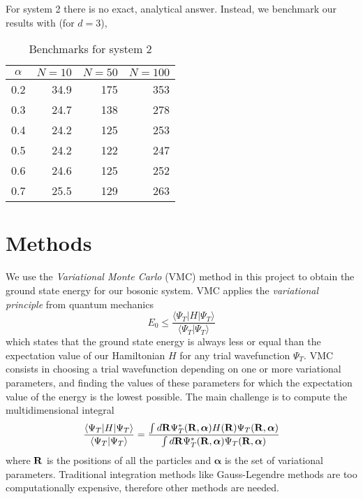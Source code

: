 \documentclass[english, a4paper]{article}
\begin{document}
\noindent For system 2 there is no exact, analytical answer. Instead, we benchmark
our results with \cite{ref1} (for $d=3$),
\begin{table}[H]
  \centering
  \begin{tabular}{ | c | r | r | r | }
    \hline
    $\alpha$& $N=10$& $N=50$& $N=100$ \\*
    \hline
    0.2& 34.9& 175& 353 \\*
    \hline
    0.3& 24.7& 138& 278 \\*
    \hline
    0.4& 24.2& 125& 253 \\*
    \hline
    0.5& 24.2& 122& 247 \\*
    \hline
    0.6& 24.6& 125& 252 \\*
    \hline
    0.7& 25.5& 129& 263 \\*
    \hline
  \end{tabular}
  \caption{Benchmarks for system 2}
  \label{tab:Tabell1}
\end{table}



















\section{Methods}

We use the \textit{Variational Monte Carlo} (VMC) method in this project to obtain the ground state energy
for our bosonic system. VMC applies the \textit{variational principle} from quantum mechanics
\begin{equation}
 E_0 \leq \frac{\langle \Psi_T | H | \Psi_T \rangle}{\langle \Psi_T | \Psi_T \rangle}
\end{equation}
which states that the ground state energy is always less or equal than the expectation value of our Hamiltonian $H$
for any trial wavefunction $\Psi_T$. VMC consists in choosing a trial wavefunction depending on one or more
variational parameters, and finding the values of these parameters for which the expectation value of the 
energy is the lowest possible. The main challenge is to compute the multidimensional integral
\begin{equation}
 \frac{\langle \Psi_T | H | \Psi_T \rangle}{\langle \Psi_T | \Psi_T \rangle} = 
 \frac{\int d {\bf R} \Psi_T^*({\bf R}, \boldsymbol{\alpha}) H({\bf R}) \Psi_T({\bf R}, \boldsymbol{\alpha})}
       {\int d {\bf R} \Psi_T^*({\bf R}, \boldsymbol{\alpha}) \Psi_T({\bf R}, \boldsymbol{\alpha})}
 \label{multidim}
\end{equation}
where $\bf{R}$ is the positions of all the particles and $\boldsymbol{\alpha}$ is the set of variational parameters.
Traditional integration methods like Gauss-Legendre methods are too computationally expensive, therefore 
other methods are needed.
\end{document}
